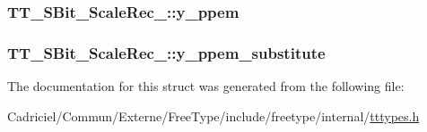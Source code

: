 \hypertarget{struct_t_t___s_bit___scale_rec___aa4c1fb419ea55c8c587ba81700c6ce66}{
\subsubsection[{y\-\_\-ppem}]{ T\-T\-\_\-\-S\-Bit\-\_\-\-Scale\-Rec\-\_\-\-::y\-\_\-ppem}}\label{struct_t_t___s_bit___scale_rec___aa4c1fb419ea55c8c587ba81700c6ce66}
\hypertarget{struct_t_t___s_bit___scale_rec___a3a9f554d0153f9e3022898c1f59a7b63}{
\subsubsection[{y\-\_\-ppem\-\_\-substitute}]{ T\-T\-\_\-\-S\-Bit\-\_\-\-Scale\-Rec\-\_\-\-::y\-\_\-ppem\-\_\-substitute}}\label{struct_t_t___s_bit___scale_rec___a3a9f554d0153f9e3022898c1f59a7b63}


The documentation for this struct was generated from the following file\-:\begin{DoxyCompactItemize}
\item 
Cadriciel/\-Commun/\-Externe/\-Free\-Type/include/freetype/internal/\hyperlink{tttypes_8h}{tttypes.\-h}\end{DoxyCompactItemize}
